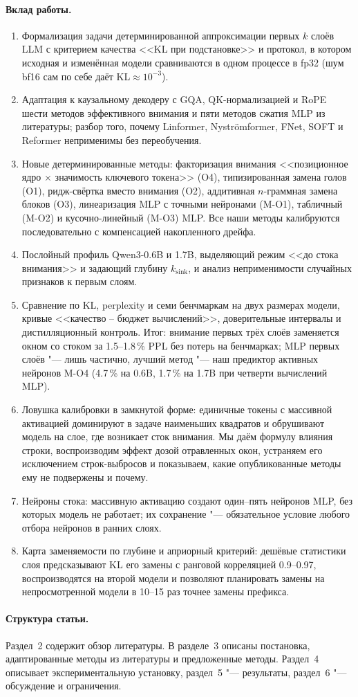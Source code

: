 \paragraph{Вклад работы.}
\begin{enumerate}
  \item Формализация задачи детерминированной аппроксимации первых
    $k$ слоёв LLM с критерием качества <<KL при подстановке>> и
    протокол, в котором исходная и изменённая модели сравниваются
    в одном процессе в fp32 (шум bf16 сам по себе даёт KL$\approx10^{-3}$).
  \item Адаптация к каузальному декодеру с GQA, QK-нормализацией и RoPE
    шести методов эффективного внимания и пяти методов сжатия MLP из
    литературы; разбор того, почему Linformer, Nyströmformer, FNet,
    SOFT и Reformer неприменимы без переобучения.
  \item Новые детерминированные методы: факторизация внимания
    <<позиционное ядро $\times$ значимость ключевого токена>> (O4),
    типизированная замена голов (O1), ридж-свёртка вместо
    внимания (O2), аддитивная $n$-граммная замена блоков (O3),
    линеаризация MLP с точными нейронами (M-O1), табличный (M-O2) и
    кусочно-линейный (M-O3) MLP. Все наши методы калибруются
    последовательно с компенсацией накопленного дрейфа.
  \item Послойный профиль Qwen3-0.6B и 1.7B, выделяющий режим <<до стока
    внимания>> и задающий глубину $k_{\mathrm{sink}}$, и анализ
    неприменимости случайных признаков к первым слоям.
  \item Сравнение по KL, perplexity и семи бенчмаркам на двух
    размерах модели, кривые <<качество -- бюджет вычислений>>,
    доверительные интервалы и дистилляционный контроль. Итог: внимание
    первых трёх слоёв заменяется окном со стоком за 1.5--1.8\,\% PPL без
    потерь на бенчмарках; MLP первых слоёв "--- лишь частично, лучший
    метод "--- наш предиктор активных нейронов M-O4 (4.7\,\% на 0.6B,
    1.7\,\% на 1.7B при четверти вычислений MLP).
  \item Ловушка калибровки в замкнутой форме: единичные токены с
    массивной активацией доминируют в задаче наименьших квадратов и
    обрушивают модель на слое, где возникает сток внимания. Мы даём
    формулу влияния строки, воспроизводим эффект дозой отравленных окон,
    устраняем его исключением строк-выбросов и показываем, какие
    опубликованные методы ему не подвержены и почему.
  \item Нейроны стока: массивную активацию создают один--пять нейронов
    MLP, без которых модель не работает; их сохранение "--- обязательное
    условие любого отбора нейронов в ранних слоях.
  \item Карта заменяемости по глубине и априорный критерий: дешёвые
    статистики слоя предсказывают KL его замены с ранговой корреляцией
    0.9--0.97, воспроизводятся на второй модели и позволяют планировать
    замены на непросмотренной модели в 10--15 раз точнее замены префикса.
\end{enumerate}

\paragraph{Структура статьи.}
Раздел~2 содержит обзор литературы. В разделе~3 описаны постановка,
адаптированные методы из литературы и предложенные методы. Раздел~4
описывает экспериментальную установку, раздел~5 "--- результаты, раздел~6
"--- обсуждение и ограничения.
